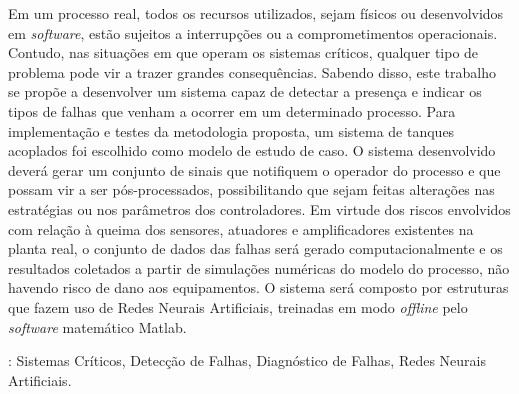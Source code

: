Em um processo real, todos os recursos utilizados, sejam físicos ou
desenvolvidos em {\it software}, estão sujeitos a interrupções ou a
comprometimentos operacionais. Contudo, nas situações em que operam os sistemas
críticos, qualquer tipo de problema pode vir a trazer grandes consequências.
Sabendo disso, este trabalho se propõe a desenvolver um sistema capaz de
detectar a presença e indicar os tipos de falhas que venham a ocorrer em um
determinado processo. Para implementação e testes da metodologia proposta, um
sistema de tanques acoplados foi escolhido como modelo de estudo de caso. O
sistema desenvolvido deverá gerar um conjunto de sinais que notifiquem o
operador do processo e que possam vir a ser pós-processados, possibilitando que
sejam feitas alterações nas estratégias ou nos parâmetros dos controladores. Em
virtude dos riscos envolvidos com relação à queima dos sensores, atuadores e
amplificadores existentes na planta real, o conjunto de dados das falhas será
gerado computacionalmente e os resultados coletados a partir de simulações
numéricas do modelo do processo, não havendo risco de dano aos equipamentos. O
sistema será composto por estruturas que fazem uso de Redes Neurais Artificiais,
treinadas em modo {\it offline} pelo {\it software} matemático Matlab\reg.

\vspace{1.5ex}

: Sistemas Críticos, Detecção de Falhas, Diagnóstico de
Falhas, Redes Neurais Artificiais.
